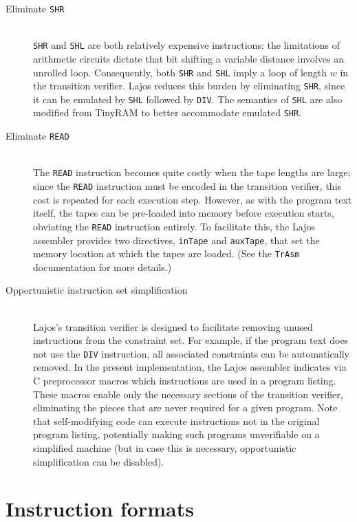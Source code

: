 \documentclass[10pt,letterpaper]{article}
\begin{document}
\begin{description}
    \item[Eliminate \texttt{SHR}]
        \hfill\\\texttt{SHR} and \texttt{SHL} are both relatively expensive instructions: the limitations of arithmetic circuits dictate that bit shifting a variable distance involves an unrolled loop. Consequently, both \texttt{SHR} and \texttt{SHL} imply a loop of length $w$ in the transition verifier. Lajos reduces this burden by eliminating \texttt{SHR}, since it can be emulated by \texttt{SHL} followed by \texttt{DIV}. The semantics of \texttt{SHL} are also modified from TinyRAM to better accommodate emulated \texttt{SHR}.

    \item[Eliminate \texttt{READ}]
        \hfill\\The \texttt{READ} instruction becomes quite costly when the tape lengths are large; since the \texttt{READ} instruction must be encoded in the transition verifier, this cost is repeated for each execution step. However, as with the program text itself, the tapes can be pre-loaded into memory before execution starts, obviating the \texttt{READ} instruction entirely. To facilitate this, the Lajos assembler provides two directives, \texttt{inTape} and \texttt{auxTape}, that set the memory location at which the tapes are loaded. (See the \texttt{TrAsm} documentation for more details.)

    \item[Opportunistic instruction set simplification]
        \hfill\\Lajos's transition verifier is designed to facilitate removing unused instructions from the constraint set. For example, if the program text does not use the \texttt{DIV} instruction, all associated constraints can be automatically removed. In the present implementation, the Lajos assembler indicates via C preprocessor macros which instructions are used in a program listing. These macros enable only the necessary sections of the transition verifier, eliminating the pieces that are never required for a given program. Note that self-modifying code can execute instructions not in the original program listing, potentially making such programs unverifiable on a simplified machine (but in case this is necessary, opportunistic simplification can be disabled).
\end{description}

\section{Instruction formats}
\end{document}
